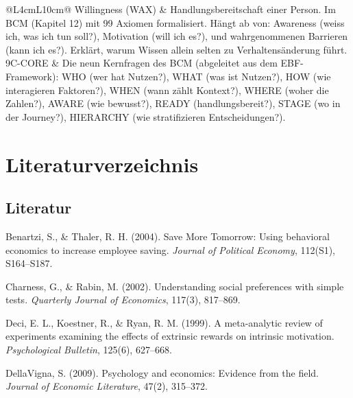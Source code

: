 \documentclass[11pt,a4paper]{article}
\begin{document}
\begin{longtable}{@{}L{4cm}L{10cm}@{}}
\midrule
Willingness (WAX) & Handlungsbereitschaft einer Person. Im BCM (Kapitel 12) mit 99 Axiomen formalisiert. Hängt ab von: Awareness (weiss ich, was ich tun soll?), Motivation (will ich es?), und wahrgenommenen Barrieren (kann ich es?). Erklärt, warum Wissen allein selten zu Verhaltensänderung führt. \\
\midrule
9C-CORE & Die neun Kernfragen des BCM (abgeleitet aus dem EBF-Framework): WHO (wer hat Nutzen?), WHAT (was ist Nutzen?), HOW (wie interagieren Faktoren?), WHEN (wann zählt Kontext?), WHERE (woher die Zahlen?), AWARE (wie bewusst?), READY (handlungsbereit?), STAGE (wo in der Journey?), HIERARCHY (wie stratifizieren Entscheidungen?). \\
\bottomrule
\end{longtable}

\newpage


\section*{Literaturverzeichnis}

\subsection*{Literatur}

Benartzi, S., \& Thaler, R. H. (2004). Save More Tomorrow: Using behavioral economics to increase employee saving. \textit{Journal of Political Economy}, 112(S1), S164--S187.

\vspace{0.3cm}
Charness, G., \& Rabin, M. (2002). Understanding social preferences with simple tests. \textit{Quarterly Journal of Economics}, 117(3), 817--869.

\vspace{0.3cm}
Deci, E. L., Koestner, R., \& Ryan, R. M. (1999). A meta-analytic review of experiments examining the effects of extrinsic rewards on intrinsic motivation. \textit{Psychological Bulletin}, 125(6), 627--668.

\vspace{0.3cm}
DellaVigna, S. (2009). Psychology and economics: Evidence from the field. \textit{Journal of Economic Literature}, 47(2), 315--372.
\end{document}
